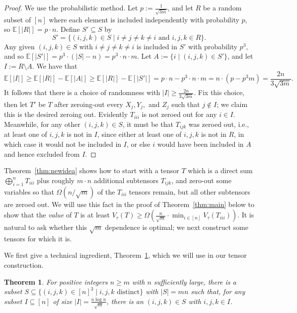 \PassOptionsToPackage{shortlabels}{enumitem}\documentclass[10pt,a4paper]{article}
\newtheorem{theorem}{Theorem}[section]
\newcommand{\E}{\mathbb{E}}
\begin{document}
\begin{proof}
We use the probabilistic method. Let $p := \frac{1}{\sqrt{3m}}$, and let $R$ be a random subset of $[n]$ where each element is included independently with probability $p$, so $\E[|R|] = p \cdot n$. Define $S' \subseteq S$ by $$S' = \{ (i,j,k) \in S \mid i\neq j \neq k \neq i \text{ and } i,j,k \in R\}.$$ Any given $(i,j,k) \in S$ with $i\neq j \neq k \neq i$ is included in $S'$ with probability $p^3$, and so $\E[|S'|] = p^3 \cdot (|S|-n) = p^3 \cdot n \cdot m$. Let $A := \{ i \mid (i,j,k) \in S'\}$, and let $I := R \setminus A$. We have that
$$\E[|I|] \geq \E[|R|] - \E[|A|] \geq \E[|R|] - \E[|S'|] = p \cdot n - p^3 \cdot n \cdot m = n\cdot (p - p^3 m) = \frac{2n}{3 \sqrt{3m}}.$$
It follows that there is a choice of randomness with $|I| \geq \frac{2n}{3 \sqrt{3m}}$. Fix this choice, then let $T'$ be $T$ after zeroing-out every $X_j,Y_j,$ and $Z_j$ such that $j \notin I$; we claim this is the desired zeroing out. Evidently $T_{iii}$ is not zeroed out for any $i\in I$. Meanwhile, for any other $(i,j,k) \in S$, it must be that $T_{ijk}$ was zeroed out, i.e., at least one of $i,j,k$ is not in $I$, since either at least one of $i,j,k$ is not in $R$, in which case it would not be included in $I$, or else $i$ would have been included in $A$ and hence excluded from $I$.
\end{proof}

Theorem~\ref{thm:newidea} shows how to start with a tensor $T$ which is a direct sum $\bigoplus_{i=1}^n T_{iii}$ plus roughly $m \cdot n$ additional subtensors $T_{ijk}$, and zero-out some variables so that $\Omega(n / \sqrt{m})$ of the $T_{iii}$ tensors remain, but all other subtensors are zeroed out. We will use this fact in the proof of Theorem~\ref{thm:main} below to show that the \emph{value} of $T$ is at least $V_\tau(T) \geq \Omega\left(\frac{n}{\sqrt{m}} \cdot \min_{i \in [n]} V_\tau(T_{iii})\right)$. It is natural to ask whether this $\sqrt{m}$ dependence is optimal; we next construct some tensors for which it is.

We first give a technical ingredient, Theorem~\ref{thm:opt1}, which we will use in our tensor construction.

\begin{theorem} \label{thm:opt1}
For positive integers $n \geq m$ with $n$ sufficiently large, there is a subset $S \subseteq \{ (i,j,k) \in [n]^3 \mid i,j,k \text{ distinct}\}$ with $|S|=mn$ such that, for any subset $I \subseteq [n]$ of size $|I| = \frac{n \log n}{\sqrt{m}}$, there is an $(i,j,k) \in S$ with $i,j,k \in I$. 
\end{theorem}
\end{document}
